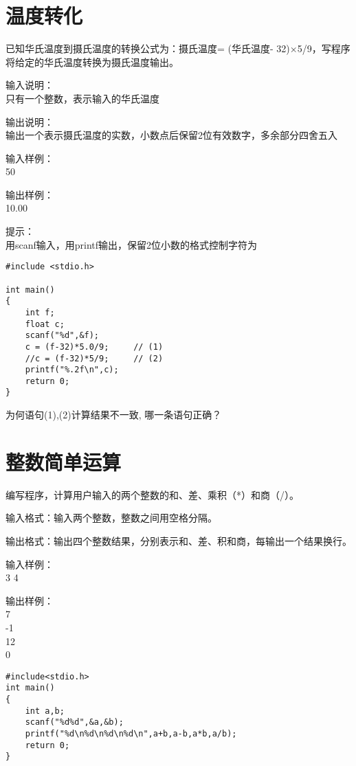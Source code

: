 \section{温度转化}
已知华氏温度到摄氏温度的转换公式为：摄氏温度= (华氏温度- 32)×5/9，写程序将给定的华氏温度转换为摄氏温度输出。

输入说明：\\
只有一个整数，表示输入的华氏温度

输出说明：\\
输出一个表示摄氏温度的实数，小数点后保留2位有效数字，多余部分四舍五入

输入样例：\\
50

输出样例：\\
10.00

提示：\\
用scanf输入，用printf输出，保留2位小数的格式控制字符为%

\begin{lstlisting}
#include <stdio.h>

int main()
{
	int f;
	float c;
	scanf("%d",&f);
	c = (f-32)*5.0/9;     // (1)
	//c = (f-32)*5/9;     // (2)
	printf("%.2f\n",c);
	return 0;
} 
\end{lstlisting}

\begin{note}[思考]
	为何语句(1),(2)计算结果不一致, 哪一条语句正确？
\end{note}


\section{整数简单运算}
编写程序，计算用户输入的两个整数的和、差、乘积（*）和商（/）。

输入格式：输入两个整数，整数之间用空格分隔。

输出格式：输出四个整数结果，分别表示和、差、积和商，每输出一个结果换行。

输入样例：\\
3 4

输出样例：\\
7  \\
-1 \\
12 \\
0

\begin{lstlisting}
#include<stdio.h>
int main()                   
{  
	int a,b;
	scanf("%d%d",&a,&b);
	printf("%d\n%d\n%d\n%d\n",a+b,a-b,a*b,a/b); 
	return 0;           
}             
\end{lstlisting}

